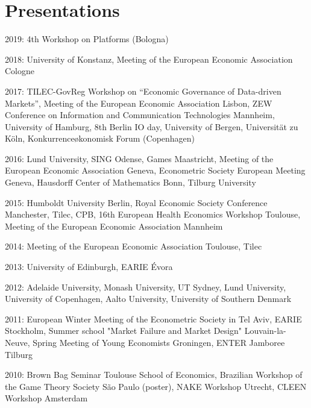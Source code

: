\documentclass[a4paper]{article}
\renewenvironment{itemize}{
  \begin{list}{}{
    \setlength{\leftmargin}{1.5em}
  }
}{
  \end{list}
}
\begin{document}
\section*{Presentations}

\begin{itemize}
  \item 2019: 4th Workshop on Platforms (Bologna)
  \item 2018: University of Konstanz, Meeting of the European Economic Association Cologne
\item 2017: TILEC-GovReg Workshop on ``Economic Governance of Data-driven Markets'', Meeting of the European Economic Association Lisbon, ZEW Conference on Information and Communication Technologies Mannheim, University of Hamburg, 8th Berlin IO day, University of Bergen, Universit\"at zu K\"oln, Konkurrence\o konomisk Forum (Copenhagen)  
\item 2016: Lund University, SING Odense, Games Maastricht, Meeting of the European Economic Association Geneva, Econometric Society European Meeting Geneva, Hausdorff Center of Mathematics Bonn, Tilburg University
\item 2015: Humboldt University Berlin, Royal Economic Society Conference Manchester, Tilec, CPB, 16th European Health Economics Workshop Toulouse, Meeting of the European Economic Association Mannheim 
\item 2014: Meeting of the European Economic Association Toulouse, Tilec 
\item 2013: University of Edinburgh, EARIE \'{E}vora 
\item 2012: Adelaide University, Monash University, UT Sydney, Lund
  University, University of Copenhagen, Aalto University,
  University of  Southern Denmark
\item  2011: European Winter Meeting of the Econometric Society in Tel
  Aviv, EARIE Stockholm, Summer school "Market Failure and Market
  Design" Louvain-la-Neuve, Spring Meeting of Young Economists
  Groningen, ENTER Jamboree
  Tilburg
\item  2010: Brown Bag Seminar Toulouse School of Economics, Brazilian
  Workshop of the Game Theory Society S\~{a}o Paulo (poster), NAKE Workshop
  Utrecht, CLEEN Workshop Amsterdam
\end{itemize}

\end{document}
